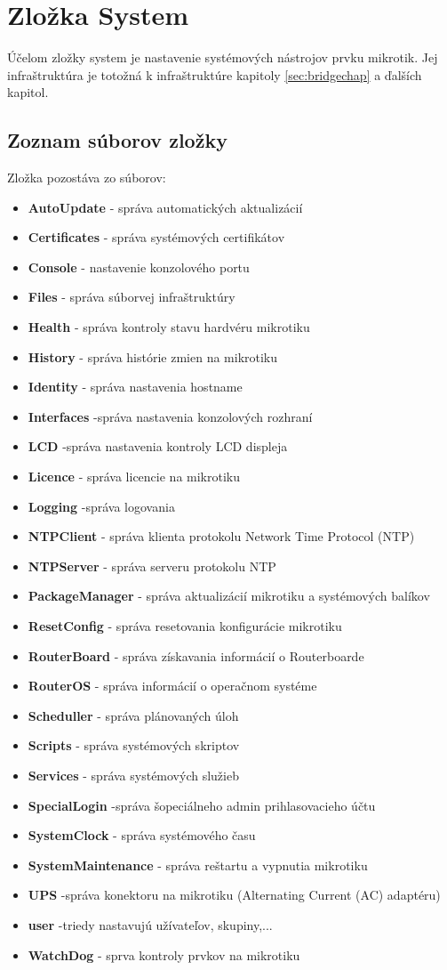 \section{Zložka System}
Účelom zložky system je nastavenie systémových nástrojov prvku mikrotik. Jej infraštruktúra je totožná k infraštruktúre kapitoly \ref{sec:bridgechap} a ďalších kapitol.
\subsection{Zoznam súborov zložky}
Zložka pozostáva zo súborov:
\begin{itemize}
\item \textbf{AutoUpdate} - správa automatických aktualizácií
\item \textbf{Certificates} - správa systémových certifikátov
\item \textbf{Console} - nastavenie konzolového portu
\item \textbf{Files} - správa súborvej infraštruktúry
\item \textbf{Health} - správa kontroly stavu hardvéru mikrotiku
\item \textbf{History} - správa histórie zmien na mikrotiku
\item \textbf{Identity} - správa nastavenia hostname
\item \textbf{Interfaces} -správa nastavenia konzolových rozhraní
\item \textbf{LCD} -správa nastavenia kontroly LCD displeja
\item \textbf{Licence} - správa licencie na mikrotiku
\item \textbf{Logging} -správa logovania 
\item \textbf{NTPClient} - správa klienta protokolu Network Time Protocol (NTP)
\item \textbf{NTPServer} - správa serveru protokolu NTP
\item \textbf{PackageManager} - správa aktualizácií mikrotiku a systémových balíkov
\item \textbf{ResetConfig} - správa resetovania konfigurácie mikrotiku
\item \textbf{RouterBoard} - správa získavania informácií o Routerboarde
\item \textbf{RouterOS} - správa informácií o operačnom systéme
\item \textbf{Scheduller} - správa plánovaných úloh
\item \textbf{Scripts} - správa systémových skriptov
\item \textbf{Services} - správa systémových služieb
\item \textbf{SpecialLogin} -správa šopeciálneho admin prihlasovacieho účtu
\item \textbf{SystemClock} - správa systémového času
\item \textbf{SystemMaintenance} - správa reštartu a vypnutia mikrotiku
\item \textbf{UPS} -správa konektoru na mikrotiku (Alternating Current (AC) adaptéru)
\item \textbf{user} -triedy nastavujú užívateľov, skupiny,...
\item \textbf{WatchDog} - sprva kontroly prvkov na mikrotiku
\end{itemize}
